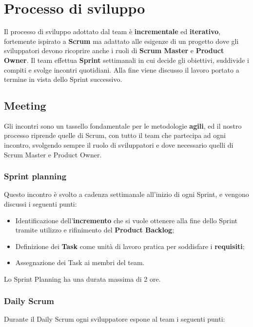 \section{Processo di sviluppo}


Il processo di sviluppo adottato dal team è \textbf{incrementale} ed \textbf{iterativo}, fortemente ispirato a \textbf{Scrum} ma adattato alle esigenze di un progetto dove gli sviluppatori devono ricoprire anche i ruoli di \textbf{Scrum Master} e \textbf{Product Owner}.
%
Il team effettua \textbf{Sprint} settimanali in cui decide gli obiettivi, suddivide i compiti e svolge incontri quotidiani.
%
Alla fine viene discusso il lavoro portato a termine in vista dello Sprint successivo.

\subsection{Meeting}
Gli incontri sono un tassello fondamentale per le metodologie \textbf{agili}, ed il nostro processo riprende quelle di Scrum, con tutto il team che partecipa ad ogni incontro, svolgendo sempre il ruolo di sviluppatori e dove necessario quelli di Scrum Master e Product Owner.

\subsubsection{Sprint planning}
Questo incontro è svolto a cadenza settimanale all'inizio di ogni Sprint, e vengono discussi i seguenti punti:

\begin{itemize}
    \item Identificazione dell'\textbf{incremento} che si vuole ottenere alla fine dello Sprint tramite utilizzo e rifinimento del \textbf{Product Backlog};
    \item Definizione dei \textbf{Task} come unità di lavoro pratica per soddisfare i \textbf{requisiti};
    \item Assegnazione dei Task ai membri del team.
\end{itemize}
Lo Sprint Planning ha una durata massima di 2 ore.

\subsubsection{Daily Scrum}
Durante il Daily Scrum ogni sviluppatore espone al team i seguenti punti:

